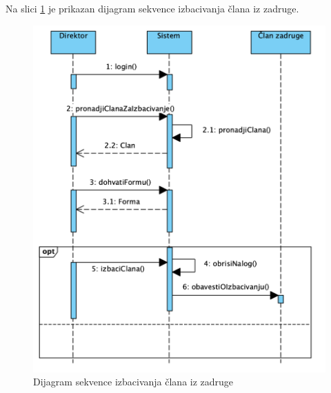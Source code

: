 \documentclass[a4paper]{article}
\begin{document}
Na slici \ref{dsekv_izbacivanje_iz_zadruge} je prikazan dijagram sekvence izbacivanja člana iz zadruge.
\begin{figure}[h!]
    \centering
    \includegraphics[scale=0.7]{images/dsekv_izbacivanje_iz_zadruge.png}
    \caption{Dijagram sekvence izbacivanja člana iz zadruge}
    \label{dsekv_izbacivanje_iz_zadruge}
\end{figure}
\clearpage
\end{document}
